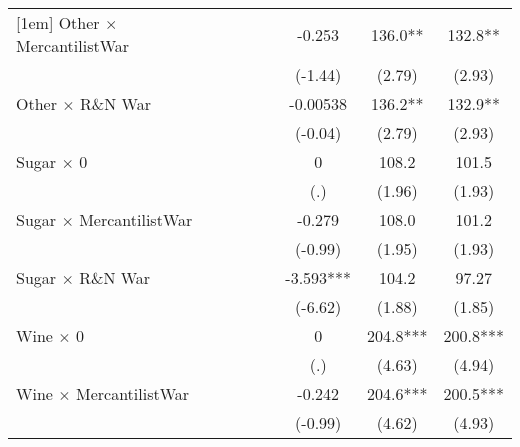 {\begin{tabular}{l*{6}{c}}
[1em]
Other $\times$ MercantilistWar&                     &                     &                     &      -0.253         &       136.0** &       132.8** \\
                    &                     &                     &                     &     (-1.44)         &      (2.79)         &      (2.93)         \\
[1em]
Other $\times$ R\&N War&                     &                     &                     &    -0.00538         &       136.2** &       132.9** \\
                    &                     &                     &                     &     (-0.04)         &      (2.79)         &      (2.93)         \\
[1em]
Sugar $\times$ 0    &                     &                     &                     &           0         &       108.2         &       101.5         \\
                    &                     &                     &                     &         (.)         &      (1.96)         &      (1.93)         \\
[1em]
Sugar $\times$ MercantilistWar&                     &                     &                     &      -0.279         &       108.0         &       101.2         \\
                    &                     &                     &                     &     (-0.99)         &      (1.95)         &      (1.93)         \\
[1em]
Sugar $\times$ R\&N War&                     &                     &                     &      -3.593***&       104.2         &       97.27         \\
                    &                     &                     &                     &     (-6.62)         &      (1.88)         &      (1.85)         \\
[1em]
Wine $\times$ 0     &                     &                     &                     &           0         &       204.8***&       200.8***\\
                    &                     &                     &                     &         (.)         &      (4.63)         &      (4.94)         \\
[1em]
Wine $\times$ MercantilistWar&                     &                     &                     &      -0.242         &       204.6***&       200.5***\\
                    &                     &                     &                     &     (-0.99)         &      (4.62)         &      (4.93)         \\

\end{tabular}}
